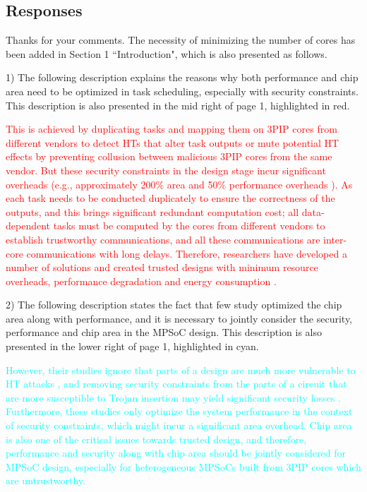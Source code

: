 \documentclass[10pt,journal, compsoc]{IEEEtran}
\begin{document}
\subsection*{Responses}

Thanks for your comments. The necessity of minimizing the number of cores has been added in Section 1 ``Introduction", which is also presented as follows.

\vspace{0.5em}
1) The following description explains the reasons why both performance and chip area need to be optimized in task scheduling, especially with security constraints. This description is also presented in the mid right of page 1, highlighted in red.

\textcolor{red}{This is achieved by duplicating tasks and mapping them on 3PIP cores from different vendors to detect HTs that alter task outputs or mute potential HT effects by preventing collusion between malicious 3PIP cores from the same vendor. But these security constraints in the design stage incur significant overheads (e.g., approximately 200\% area and 50\% performance overheads \cite{article:XC}). As each task needs to be conducted duplicately to ensure the correctness of the outputs, and this brings significant redundant computation cost; all data-dependent tasks must be computed by the cores from different vendors to establish trustworthy communications, and all these communications are inter-core communications with long delays. Therefore, researchers have developed a number of solutions and created trusted designs with minimum resource overheads, performance degradation and energy consumption \cite{article:SR, conference:AS, article:YS, article:XC}.}

\vspace{0.5em}
2) The following description states the fact that few study optimized the chip area along with performance, and it is necessary to jointly consider the security, performance and chip area in the MPSoC design. This description is also presented in the lower right of page 1, highlighted in cyan.

\textcolor{cyan}{However, their studies ignore that parts of a design are much more vulnerable to HT attacks \cite{conference:HS}, and removing security constraints from the parts of a circuit that are more susceptible to Trojan insertion may yield significant security losses \cite{article:XC}. Furthermore, these studies only optimize the system performance in the context of security constraints, which might incur a significant area overhead. Chip area is also one of the critical issues towards trusted design, and therefore, performance and security along with chip area should be jointly considered for MPSoC design, especially for heterogeneous MPSoCs built from 3PIP cores which are untrustworthy.}
\end{document}
